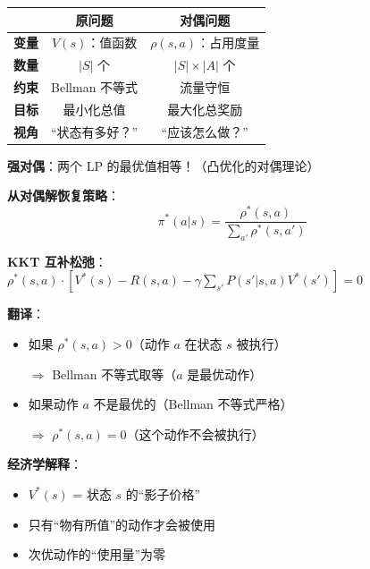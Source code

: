 \documentclass[12pt, a4paper]{ctexart}
\begin{document}
\begin{blackboard}

\begin{center}
\begin{tabular}{c|c|c}
& \textbf{原问题} & \textbf{对偶问题} \\
\hline
\textbf{变量} & $V(s)$：值函数 & $\rho(s,a)$：占用度量 \\
\textbf{数量} & $|S|$ 个 & $|S| \times |A|$ 个 \\
\textbf{约束} & Bellman 不等式 & 流量守恒 \\
\textbf{目标} & 最小化总值 & 最大化总奖励 \\
\textbf{视角} & ``状态有多好？'' & ``应该怎么做？''
\end{tabular}
\end{center}

\textbf{强对偶}：两个 LP 的最优值相等！（凸优化的对偶理论）

\textbf{从对偶解恢复策略}：
\[
\pi^*(a|s) = \frac{\rho^*(s,a)}{\sum_{a'} \rho^*(s,a')}
\]

\end{blackboard}

\begin{blackboard}

\textbf{KKT 互补松弛}：$\rho^*(s,a) \cdot \left[ V^*(s) - R(s,a) - \gamma \sum_{s'} P(s'|s,a) V^*(s') \right] = 0$

\textbf{翻译}：
\begin{itemize}
    \item 如果 $\rho^*(s,a) > 0$（动作 $a$ 在状态 $s$ 被执行）
    
    $\Rightarrow$ Bellman 不等式取等（$a$ 是最优动作）
    
    \item 如果动作 $a$ 不是最优的（Bellman 不等式严格）
    
    $\Rightarrow$ $\rho^*(s,a) = 0$（这个动作不会被执行）
\end{itemize}

\textbf{经济学解释}：
\begin{itemize}
    \item $V^*(s)$ = 状态 $s$ 的``影子价格''
    \item 只有``物有所值''的动作才会被使用
    \item 次优动作的``使用量''为零
\end{itemize}

\end{blackboard}
\end{document}

